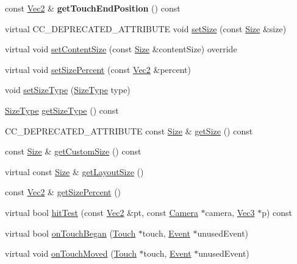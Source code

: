 \begin{DoxyCompactItemize}
const \hyperlink{classVec2}{Vec2} \& {\bfseries get\+Touch\+End\+Position} () const
\item 
virtual C\+C\+\_\+\+D\+E\+P\+R\+E\+C\+A\+T\+E\+D\+\_\+\+A\+T\+T\+R\+I\+B\+U\+TE void \hyperlink{classui_1_1Widget_aac333fa30ce7350fbf9283e690959a58}{set\+Size} (const \hyperlink{classSize}{Size} \&size)
\item 
virtual void \hyperlink{classui_1_1Widget_af5f35184ff3de275929e937f81a4ae30}{set\+Content\+Size} (const \hyperlink{classSize}{Size} \&content\+Size) override
\item 
virtual void \hyperlink{classui_1_1Widget_a6992d881e606beb32dd95af57bd7f1f8}{set\+Size\+Percent} (const \hyperlink{classVec2}{Vec2} \&percent)
\item 
void \hyperlink{classui_1_1Widget_a0227da458f10e9f3bcb4e2137a0a05e5}{set\+Size\+Type} (\hyperlink{classui_1_1Widget_ab7035fc10a00c756523be6bc57cf801c}{Size\+Type} type)
\item 
\hyperlink{classui_1_1Widget_ab7035fc10a00c756523be6bc57cf801c}{Size\+Type} \hyperlink{classui_1_1Widget_a00e0c3f1c0debdf4ed6003b77a000399}{get\+Size\+Type} () const
\item 
C\+C\+\_\+\+D\+E\+P\+R\+E\+C\+A\+T\+E\+D\+\_\+\+A\+T\+T\+R\+I\+B\+U\+TE const \hyperlink{classSize}{Size} \& \hyperlink{classui_1_1Widget_ad26f6b24c6d5c529c800783b09478f82}{get\+Size} () const
\item 
const \hyperlink{classSize}{Size} \& \hyperlink{classui_1_1Widget_a86d86ee353d3246754e5a34e9b391ce4}{get\+Custom\+Size} () const
\item 
virtual const \hyperlink{classSize}{Size} \& \hyperlink{classui_1_1Widget_a170d1942e94f24cc01aa7cb146b10dc8}{get\+Layout\+Size} ()
\item 
const \hyperlink{classVec2}{Vec2} \& \hyperlink{classui_1_1Widget_afd245724f3c02d72f56c11f45c765ced}{get\+Size\+Percent} ()
\item 
virtual bool \hyperlink{classui_1_1Widget_a43d822889ce6b190d3f462dd3dedc0a4}{hit\+Test} (const \hyperlink{classVec2}{Vec2} \&pt, const \hyperlink{classCamera}{Camera} $\ast$camera, \hyperlink{classVec3}{Vec3} $\ast$p) const
\item 
virtual bool \hyperlink{classui_1_1Widget_a130372b032ebba2c5328f66c11a3d268}{on\+Touch\+Began} (\hyperlink{classTouch}{Touch} $\ast$touch, \hyperlink{classEvent}{Event} $\ast$unused\+Event)
\item 
virtual void \hyperlink{classui_1_1Widget_a4db5ae7799818d9150316e152191d95d}{on\+Touch\+Moved} (\hyperlink{classTouch}{Touch} $\ast$touch, \hyperlink{classEvent}{Event} $\ast$unused\+Event)

\end{DoxyCompactItemize}
